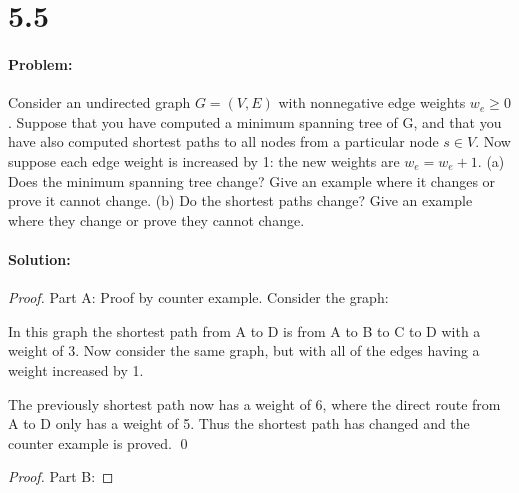 \documentclass[12pt]{article}
\begin{document}
\section*{5.5}
\paragraph{Problem:}

Consider an undirected graph $G = (V, E)$ with nonnegative edge weights $ w_e \ge 0$. Suppose that
you have computed a minimum spanning tree of G, and that you have also computed shortest
paths to all nodes from a particular node $s \in V$.
Now suppose each edge weight is increased by 1: the new weights are $w_e = w_e + 1$.
(a) Does the minimum spanning tree change? Give an example where it changes or prove it
cannot change.
(b) Do the shortest paths change? Give an example where they change or prove they cannot
change.
\paragraph{Solution:}
\begin{proof}
Part A:  Proof by counter example.
Consider the graph:

In this graph the shortest path from A to D is from A to B to C to D with a weight of 3.
Now consider the same graph, but with all of the edges having a weight increased by 1.

The previously shortest path now has a weight of 6, where the direct route from A to D only has a weight of 5.  Thus the shortest path has changed and the counter example is proved.  \qed
\end{proof}
\begin{proof}
Part B:
\end{proof}
\end{document}
